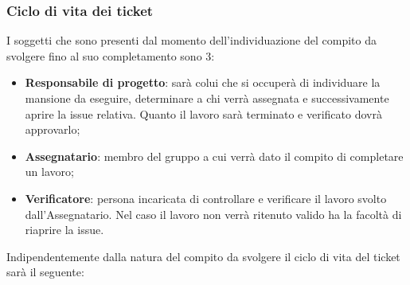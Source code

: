         \subsubsection{Ciclo di vita dei ticket}
            I soggetti che sono presenti dal momento dell’individuazione del compito da svolgere fino al suo completamento sono 3:
            \begin{itemize}
                \item\textbf{Responsabile di progetto}: sarà colui che si occuperà di individuare la mansione da eseguire, determinare a chi verrà assegnata e successivamente aprire la issue relativa. Quanto il lavoro sarà terminato e verificato dovrà approvarlo;
                \item\textbf{Assegnatario}: membro del gruppo a cui verrà dato il compito di completare un lavoro;
                \item\textbf{Verificatore}: persona incaricata di controllare e verificare il lavoro svolto dall'Assegnatario. Nel caso il lavoro non verrà ritenuto valido ha la facoltà di riaprire la issue.
            \end{itemize}
            Indipendentemente dalla natura del compito da svolgere il ciclo di vita del ticket sarà il seguente:
